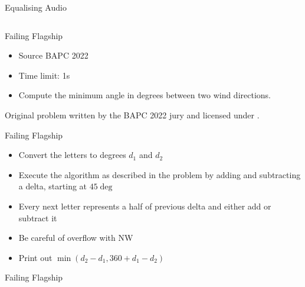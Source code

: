 \documentclass[11pt,pdf, aspectratio=169]{beamer}
\begin{document}
  \begin{frame}[containsverbatim]{ Equalising Audio}
    \inputminted{python}{code/session-1/python/bapc-e.py}
  \end{frame}
  \begin{frame}{Failing Flagship}
    \begin{itemize}
      \item Source BAPC 2022
      \item Time limit: 1s
      \item  Compute the minimum angle in degrees between two wind directions.
    \end{itemize}
    Original problem written by the BAPC 2022 jury and licensed under \doclicenseLongNameRef.

    \doclicenseImage
  \end{frame}
  \begin{frame}{Failing Flagship}
    \begin{itemize}
      \item<1-> Convert the letters to degrees $d_1$ and $d_2$
      \item<2-> Execute the algorithm as described in the problem by adding and subtracting a delta, starting at $45\deg$
      \item<3-> Every next letter represents a half of previous delta and either add or subtract it
      \item<4-> Be careful of overflow with NW
      \item<4-> Print out $\min(d_2-d_1, 360+d_1-d_2)$
    \end{itemize}
  \end{frame}
  \begin{frame}[containsverbatim]{Failing Flagship}
    \inputminted{python}{code/session-1/python/bapc-f.py}
  \end{frame}
\end{document}
